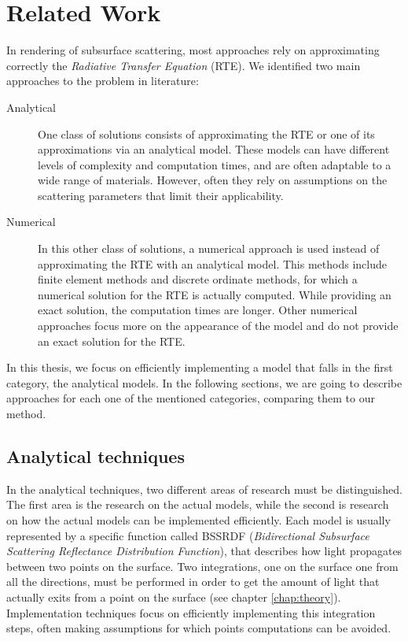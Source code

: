 \chapter{Related Work}
\label{chap:previous}
In rendering of subsurface scattering, most approaches rely on approximating correctly the \emph{Radiative Transfer Equation} (RTE). We identified two main approaches to the problem in literature:

\begin{description}
	\item[Analytical] One class of solutions consists of approximating the RTE or one of its approximations via an analytical model. These models can have different levels of complexity and computation times, and are often adaptable to a wide range of materials. However, often they rely on assumptions on the scattering parameters that limit their applicability.
	\item[Numerical] In this other class of solutions, a numerical approach is used instead of approximating the RTE with an analytical model. This methods include finite element methods and discrete ordinate methods, for which a numerical solution for the RTE is actually computed. While providing an exact solution, the computation times are longer. Other numerical approaches focus more on the appearance of the model and do not provide an exact solution for the RTE.
\end{description}

In this thesis, we focus on efficiently implementing a model that falls in the first category, the analytical models. In the following sections, we are going to describe approaches for each one of the mentioned categories, comparing them to our method.

\section{Analytical techniques}

In the analytical techniques, two different areas of research must be distinguished. The first area is the research on the actual models, while the second is research on how the actual models can be implemented efficiently. Each model is usually represented by a specific function called BSSRDF (\emph{Bidirectional Subsurface Scattering Reflectance Distribution Function}), that describes how light propagates between two points on the surface. Two integrations, one on the surface one from all the directions, must be performed in order to get the amount of light that actually exits from a point on the surface (see chapter \ref{chap:theory}). Implementation techniques focus on efficiently implementing this integration steps, often making assumptions for which points computations can be avoided. 

